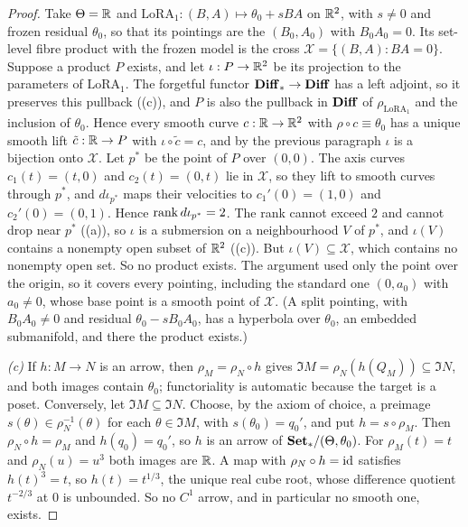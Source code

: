 \begin{proof}
Take $\Theta=\mathbb{R}$ and $\mathrm{LoRA}_1:(B,A)\mapsto\theta_0+sBA$ on $\mathbb{R}^2$, with $s\ne0$ and frozen residual $\theta_0$,
so that its pointings are the $(B_0,A_0)$ with $B_0A_0=0$. Its set-level fibre product with the frozen model is the cross
$\mathcal X=\{(B,A):BA=0\}$. Suppose a product $P$ exists, and let $\iota:P\to\mathbb{R}^2$ be its projection to the parameters
of $\mathrm{LoRA}_1$. The forgetful functor $\mathbf{Diff}_*\to\mathbf{Diff}$ has a left adjoint, so it preserves this pullback
((c)), and $P$ is also the pullback in $\mathbf{Diff}$ of $\rho_{\mathrm{LoRA}_1}$ and the inclusion of $\theta_0$.
Hence every smooth curve $c:\mathbb{R}\to\mathbb{R}^2$ with $\rho\circ c\equiv\theta_0$ has a unique smooth lift $\tilde c:\mathbb{R}\to P$ with
$\iota\circ\tilde c=c$, and by the previous paragraph $\iota$ is a bijection onto $\mathcal X$. Let $p^*$ be the point of
$P$ over $(0,0)$. The axis curves $c_1(t)=(t,0)$ and $c_2(t)=(0,t)$ lie in $\mathcal X$, so they lift to smooth curves
through $p^*$, and $d\iota_{p^*}$ maps their velocities to $c_1'(0)=(1,0)$ and $c_2'(0)=(0,1)$. Hence
$\operatorname{rank} d\iota_{p^*}=2$. The rank cannot exceed $2$ and cannot drop near $p^*$ ((a)), so $\iota$ is a submersion
on a neighbourhood $V$ of $p^*$, and $\iota(V)$ contains a nonempty open subset of $\mathbb{R}^2$ ((c)). But
$\iota(V)\subseteq\mathcal X$, which contains no nonempty open set. So no product exists. The argument used only the
point over the origin, so it covers every pointing, including the standard one $(0,a_0)$ with $a_0\ne0$, whose base
point is a smooth point of $\mathcal X$. (A split pointing, with $B_0A_0\ne0$ and residual $\theta_0-sB_0A_0$, has a
hyperbola over $\theta_0$, an embedded submanifold, and there the product exists.)

\emph{(c)} If $h:M\to N$ is an arrow, then $\rho_M=\rho_N\circ h$ gives $\Im M=\rho_N(h(Q_M))\subseteq\Im N$, and both
images contain $\theta_0$; functoriality is automatic because the target is a poset. Conversely, let
$\Im M\subseteq\Im N$. Choose, by the axiom of choice, a preimage $s(\theta)\in\rho_N^{-1}(\theta)$ for each
$\theta\in\Im M$, with $s(\theta_0)=q_0'$, and put $h=s\circ\rho_M$. Then $\rho_N\circ h=\rho_M$ and $h(q_0)=q_0'$, so $h$
is an arrow of $\mathbf{Set}_*/(\Theta,\theta_0)$. For $\rho_M(t)=t$ and $\rho_N(u)=u^3$ both images are $\mathbb{R}$. A map with
$\rho_N\circ h=\mathrm{id}$ satisfies $h(t)^3=t$, so $h(t)=t^{1/3}$, the unique real cube root, whose difference quotient
$t^{-2/3}$ at $0$ is unbounded. So no $C^1$ arrow, and in particular no smooth one, exists.
\end{proof}

